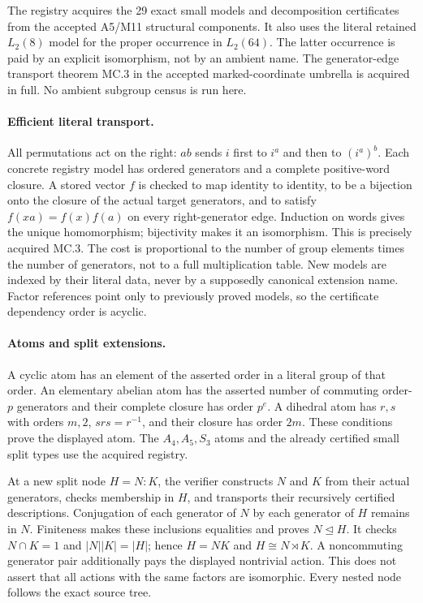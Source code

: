 \documentclass[11pt]{article}
\begin{document}
The registry acquires the 29 exact small models and decomposition certificates
from the accepted A5/M11 structural components. It also uses the literal
retained $L_2(8)$ model for the proper occurrence in $L_2(64)$. The latter
occurrence is paid by an explicit isomorphism, not by an ambient name.
The generator-edge transport theorem MC.3 in the accepted marked-coordinate
umbrella is acquired in full. No ambient subgroup census is run here.

\newpage
\paragraph{Efficient literal transport.}
All permutations act on the right: $ab$ sends $i$ first to $i^a$ and then to
$(i^a)^b$. Each concrete registry model has ordered generators and a complete
positive-word closure. A stored vector $f$ is checked to map identity to
identity, to be a bijection onto the closure of the actual target generators,
and to satisfy $f(xa)=f(x)f(a)$ on every right-generator edge. Induction on
words gives the unique homomorphism; bijectivity makes it an isomorphism.
This is precisely acquired MC.3. The cost is proportional to the number of
group elements times the number of generators, not to a full multiplication
table. New models are indexed by their literal data, never by a supposedly
canonical extension name. Factor references point only to previously proved
models, so the certificate dependency order is acyclic.

\paragraph{Atoms and split extensions.}
A cyclic atom has an element of the asserted order in a literal group of
that order. An elementary abelian atom has the asserted number of commuting
order-$p$ generators and their complete closure has order $p^e$. A dihedral
atom has $r,s$ with orders $m,2$, $srs=r^{-1}$, and their closure has order
$2m$. These conditions prove the displayed atom. The $A_4,A_5,S_3$ atoms and
the already certified small split types use the acquired registry.

At a new split node $H=N:K$, the verifier constructs $N$ and $K$ from their
actual generators, checks membership in $H$, and transports their recursively
certified descriptions. Conjugation of each generator of $N$ by each generator
of $H$ remains in $N$. Finiteness makes these inclusions equalities and proves
$N\trianglelefteq H$. It checks $N\cap K=1$ and $|N||K|=|H|$; hence $H=NK$
and $H\cong N\rtimes K$. A noncommuting generator pair additionally pays the
displayed nontrivial action. This does not assert that all actions with the
same factors are isomorphic. Every nested node follows the exact source tree.
\end{document}
